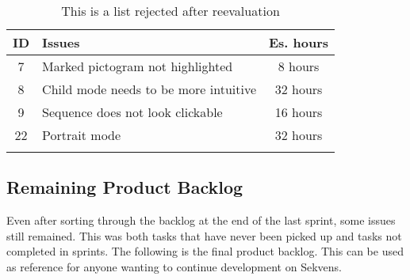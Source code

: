 \begin{longtable} { | c | p{12cm} | c | } 
\hline
	ID 	&	Issues	&	 Es. hours \\\hline
	7	& 	Marked pictogram not highlighted		& 	8 hours  \\\hline
	8	& 	Child mode needs to be more intuitive		& 	32 hours  \\\hline
	9	& 	Sequence does not look clickable 	& 	16 hours  \\\hline
	22	& 	Portrait mode	& 	32 hours  \\\hline
\caption{This is a list rejected after reevaluation}
\label{tab:rejected_prodblog}
\end{longtable}


\subsection{Remaining Product Backlog}
Even after sorting through the backlog at the end of the last sprint, some issues still remained. This was both tasks that have never been picked up and tasks not completed in sprints. The following is the final product backlog. This can be used as reference for anyone wanting to continue development on Sekvens.

